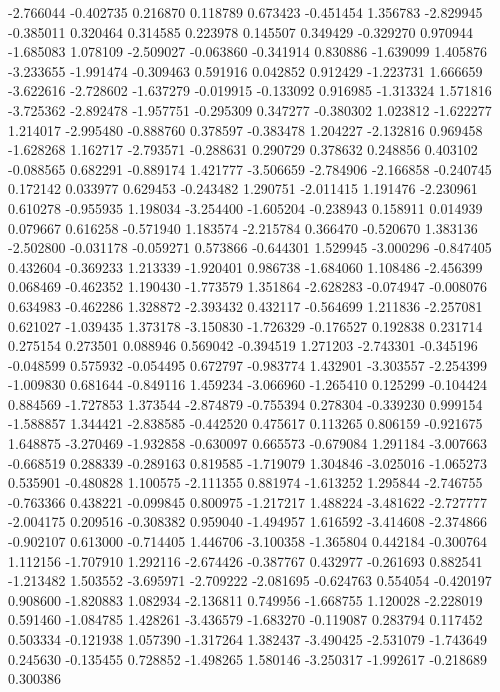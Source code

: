 -2.766044
-0.402735
0.216870
0.118789
0.673423
-0.451454
1.356783
-2.829945
-0.385011
0.320464
0.314585
0.223978
0.145507
0.349429
-0.329270
0.970944
-1.685083
1.078109
-2.509027
-0.063860
-0.341914
0.830886
-1.639099
1.405876
-3.233655
-1.991474
-0.309463
0.591916
0.042852
0.912429
-1.223731
1.666659
-3.622616
-2.728602
-1.637279
-0.019915
-0.133092
0.916985
-1.313324
1.571816
-3.725362
-2.892478
-1.957751
-0.295309
0.347277
-0.380302
1.023812
-1.622277
1.214017
-2.995480
-0.888760
0.378597
-0.383478
1.204227
-2.132816
0.969458
-1.628268
1.162717
-2.793571
-0.288631
0.290729
0.378632
0.248856
0.403102
-0.088565
0.682291
-0.889174
1.421777
-3.506659
-2.784906
-2.166858
-0.240745
0.172142
0.033977
0.629453
-0.243482
1.290751
-2.011415
1.191476
-2.230961
0.610278
-0.955935
1.198034
-3.254400
-1.605204
-0.238943
0.158911
0.014939
0.079667
0.616258
-0.571940
1.183574
-2.215784
0.366470
-0.520670
1.383136
-2.502800
-0.031178
-0.059271
0.573866
-0.644301
1.529945
-3.000296
-0.847405
0.432604
-0.369233
1.213339
-1.920401
0.986738
-1.684060
1.108486
-2.456399
0.068469
-0.462352
1.190430
-1.773579
1.351864
-2.628283
-0.074947
-0.008076
0.634983
-0.462286
1.328872
-2.393432
0.432117
-0.564699
1.211836
-2.257081
0.621027
-1.039435
1.373178
-3.150830
-1.726329
-0.176527
0.192838
0.231714
0.275154
0.273501
0.088946
0.569042
-0.394519
1.271203
-2.743301
-0.345196
-0.048599
0.575932
-0.054495
0.672797
-0.983774
1.432901
-3.303557
-2.254399
-1.009830
0.681644
-0.849116
1.459234
-3.066960
-1.265410
0.125299
-0.104424
0.884569
-1.727853
1.373544
-2.874879
-0.755394
0.278304
-0.339230
0.999154
-1.588857
1.344421
-2.838585
-0.442520
0.475617
0.113265
0.806159
-0.921675
1.648875
-3.270469
-1.932858
-0.630097
0.665573
-0.679084
1.291184
-3.007663
-0.668519
0.288339
-0.289163
0.819585
-1.719079
1.304846
-3.025016
-1.065273
0.535901
-0.480828
1.100575
-2.111355
0.881974
-1.613252
1.295844
-2.746755
-0.763366
0.438221
-0.099845
0.800975
-1.217217
1.488224
-3.481622
-2.727777
-2.004175
0.209516
-0.308382
0.959040
-1.494957
1.616592
-3.414608
-2.374866
-0.902107
0.613000
-0.714405
1.446706
-3.100358
-1.365804
0.442184
-0.300764
1.112156
-1.707910
1.292116
-2.674426
-0.387767
0.432977
-0.261693
0.882541
-1.213482
1.503552
-3.695971
-2.709222
-2.081695
-0.624763
0.554054
-0.420197
0.908600
-1.820883
1.082934
-2.136811
0.749956
-1.668755
1.120028
-2.228019
0.591460
-1.084785
1.428261
-3.436579
-1.683270
-0.119087
0.283794
0.117452
0.503334
-0.121938
1.057390
-1.317264
1.382437
-3.490425
-2.531079
-1.743649
0.245630
-0.135455
0.728852
-1.498265
1.580146
-3.250317
-1.992617
-0.218689
0.300386
